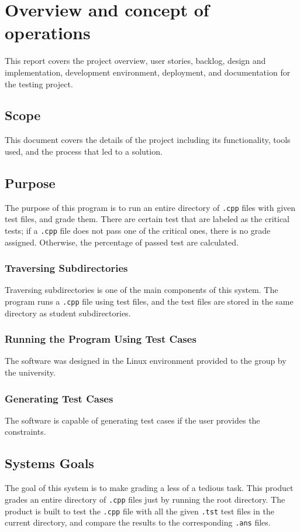 
\chapter{Overview and concept of operations}

This report covers the project overview, user stories, backlog, design and implementation, development environment, deployment, and documentation for the testing project. 


\section{Scope}
This document covers the details of the project including its functionality, tools used, and the process that led to a solution.


\section{Purpose}
The purpose of this program is to run an entire directory of {\tt .cpp} files with given test files, and grade them. There are certain test that are labeled as the critical tests; if a {\tt .cpp} file does not pass one of the critical ones, there is no grade assigned. Otherwise, the percentage of passed test are calculated. 


\subsection{Traversing Subdirectories}
Traversing subdirectories is one of the main components of this system. The program runs a {\tt .cpp} file using test files, and the test files are stored in the same directory as student subdirectories.  

\subsection{Running the Program Using Test Cases}
The software was designed in the Linux environment provided to the group by the university. 

\subsection{Generating Test Cases}
The software is capable of generating test cases if the user provides the constraints. 
 
\section{Systems Goals}
The goal of this system is to make grading a less of a tedious task. This product grades an entire directory of {\tt .cpp} files just by running the root directory. The product is built to test the {\tt .cpp} file with all the given {\tt .tst} test files in the current directory, and compare the results to the corresponding {\tt .ans} files.  

